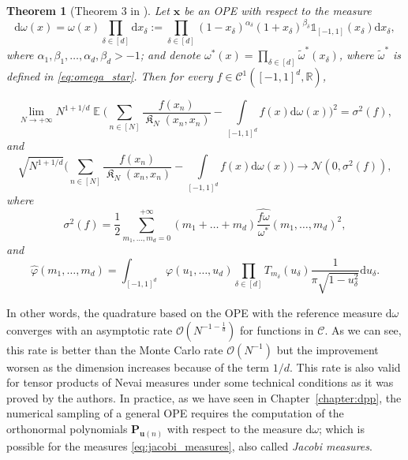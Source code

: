 \documentclass[twoside,11pt]{book}
\newtheorem{theorem}{Theorem}
\numberwithin{theorem}{chapter}
\numberwithin{definition}{chapter}
\numberwithin{proposition}{chapter}
\numberwithin{corollary}{chapter}
\numberwithin{example}{chapter}
\numberwithin{lemma}{chapter}
\numberwithin{assumption}{chapter}
\DeclareMathOperator{\EX}{\mathbb{E}}
\DeclareMathOperator*{\KDPP}{\mathfrak{K}}
\begin{document}
\begin{theorem}[Theorem 3 in \citep{BaHa16}]
Let $\bm{x}$ be an OPE with respect to the measure 
\begin{equation}\label{eq:jacobi_measures}
\mathrm{d}\omega(x) = \omega(x) \prod\limits_{\delta \in [d]} \mathrm{d}x_{\delta} := \prod\limits_{\delta \in [d]} (1-x_{\delta})^{\alpha_{\delta}}(1+x_{\delta})^{\beta_{\delta}} \mathbb{1}_{[-1,1]}(x_{\delta}) \mathrm{d}x_{\delta},
\end{equation}
where $\alpha_{1}, \beta_{1}, \dots, \alpha_{d}, \beta_{d} > -1$; and denote $ \omega^{*}(x) = \prod_{\delta \in [d]} \tilde{\omega}^{*}(x_{\delta})$, where $\tilde{\omega}^{*}$ is defined in \eqref{eq:omega_star}.
Then for every $f \in \mathcal{C}^{1}([-1,1]^{d}, \mathbb{R})$,

\begin{equation}
\lim\limits_{N \rightarrow +\infty} N^{1+1/d} \EX \bigg( \sum_{n \in [N]}\frac{f(x_{n})}{\KDPP_{N}(x_{n},x_{n})} - \int\limits_{[-1,1]^{d}} f(x) \mathrm{d}\omega(x) \bigg)^{2}  =  \sigma^{2}(f),
\end{equation}
and
\begin{equation}
\sqrt{N^{1+1/d}} \bigg( \sum_{n \in [N]}\frac{f(x_{n})}{\KDPP_{N}(x_{n},x_{n})} - \int\limits_{[-1,1]^{d}} f(x) \mathrm{d}\omega(x) \bigg) \rightarrow \mathcal{N}(0,\sigma^{2}(f)),
\end{equation}
where
\begin{equation}
\sigma^{2}(f) = \frac{1}{2} \sum\limits_{m_{1}, \dots , m_{d} = 0}^{+\infty} (m_{1}+\dots +m_{d}) \widehat{\frac{f \omega}{\omega^{*}}} (m_{1}, \dots, m_{d})^{2},
\end{equation}
and 
\begin{equation}
\hat{\varphi}(m_{1},\dots,m_{d}) = \int_{[-1,1]^{d}} \varphi(u_{1}, \dots, u_{d}) \prod\limits_{\delta \in [d]} T_{m_{\delta}}(u_{\delta}) \frac{1}{\pi \sqrt{1-u_{\delta}^{2}}} \mathrm{d}u_{\delta}.
\end{equation}

\end{theorem}

In other words, the quadrature based on the OPE with the reference measure $\mathrm{d}\omega$ converges with an asymptotic rate $\mathcal{O}(N^{-1-\frac{1}{d}})$ for functions in $\mathcal{C}$. 
 As we can see, this rate is better than the Monte Carlo rate $\mathcal{O}(N^{-1})$ but the improvement worsen as the dimension increases because of the term $1/d$. This rate is also valid for tensor products of Nevai measures under some technical conditions as it was proved by the authors. In practice, as we have seen in Chapter~\ref{chapter:dpp}, the numerical sampling of a general OPE requires the computation of the orthonormal polynomials $\bm{P}_{\bm{u}(n)}$ with respect to the measure $\mathrm{d}\omega$; which is possible for the measures \eqref{eq:jacobi_measures}, also called \emph{Jacobi measures}. 
\end{document}
